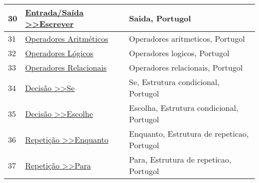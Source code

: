 \begin{longtable}{| p{} | p{} | p{} |}
30  & \href{http://www.dei.estt.ipt.pt/portugol/node/15}{Entrada/Saída \textgreater{}\textgreater Escrever                                   } & Saida, Portugol                                                                                                                                   \\ \hline
31  & \href{http://www.dei.estt.ipt.pt/portugol/node/17}{Operadores Aritméticos                                                              } & Operadores aritmeticos, Portugol                                                                                                                  \\ \hline
32  & \href{http://www.dei.estt.ipt.pt/portugol/node/21}{Operadores Lógicos                                                                  } & Operadores logicos, Portugol                                                                                                                      \\ \hline
33  & \href{http://www.dei.estt.ipt.pt/portugol/node/22}{Operadores Relacionais                                                              } & Operadores relacionais, Portugol                                                                                                                  \\ \hline
34  & \href{http://www.dei.estt.ipt.pt/portugol/node/24}{Decisão \textgreater{}\textgreater Se                                               } & Se, Estrutura condicional, Portugol                                                                                                               \\ \hline
35  & \href{http://www.dei.estt.ipt.pt/portugol/node/25}{Decisão \textgreater{}\textgreater Escolhe                                          } & Escolha, Estrutura condicional, Portugol                                                                                                          \\ \hline
36  & \href{http://www.dei.estt.ipt.pt/portugol/node/27}{Repetição \textgreater{}\textgreater Enquanto                                       } & Enquanto, Estrutura de repeticao, Portugol                                                                                                        \\ \hline
37  & \href{http://www.dei.estt.ipt.pt/portugol/node/28}{Repetição \textgreater{}\textgreater Para                                           } & Para, Estrutura de repeticao, Portugol                                                                                                            \\ \hline

\end{longtable}
